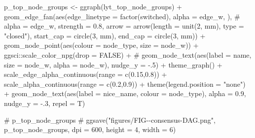 \documentclass[
  letterpaper,
  DIV=11,
  numbers=noendperiod]{scrartcl}
\newenvironment{Shaded}{\begin{snugshade}}{\end{snugshade}}
\newcommand{\AttributeTok}[1]{\textcolor[rgb]{0.40,0.45,0.13}{#1}}
\newcommand{\CommentTok}[1]{\textcolor[rgb]{0.37,0.37,0.37}{#1}}
\newcommand{\ConstantTok}[1]{\textcolor[rgb]{0.56,0.35,0.01}{#1}}
\newcommand{\DecValTok}[1]{\textcolor[rgb]{0.68,0.00,0.00}{#1}}
\newcommand{\FloatTok}[1]{\textcolor[rgb]{0.68,0.00,0.00}{#1}}
\newcommand{\FunctionTok}[1]{\textcolor[rgb]{0.28,0.35,0.67}{#1}}
\newcommand{\NormalTok}[1]{\textcolor[rgb]{0.00,0.23,0.31}{#1}}
\newcommand{\OtherTok}[1]{\textcolor[rgb]{0.00,0.23,0.31}{#1}}
\newcommand{\SpecialCharTok}[1]{\textcolor[rgb]{0.37,0.37,0.37}{#1}}
\newcommand{\StringTok}[1]{\textcolor[rgb]{0.13,0.47,0.30}{#1}}
\begin{document}
\begin{Shaded}
\begin{Highlighting}[]
\NormalTok{p\_top\_node\_groups }\OtherTok{\textless{}{-}} \FunctionTok{ggraph}\NormalTok{(lyt\_top\_node\_groups) }\SpecialCharTok{+}
    \FunctionTok{geom\_edge\_fan}\NormalTok{(}\FunctionTok{aes}\NormalTok{(}\AttributeTok{edge\_linetype =} \FunctionTok{factor}\NormalTok{(switched), }\AttributeTok{alpha =}\NormalTok{ edge\_w, ), }\CommentTok{\# alpha = edge\_w, }
                  \AttributeTok{strength =} \FloatTok{0.8}\NormalTok{,}
                  \AttributeTok{arrow =} \FunctionTok{arrow}\NormalTok{(}\AttributeTok{length =} \FunctionTok{unit}\NormalTok{(}\DecValTok{2}\NormalTok{, }\StringTok{\textquotesingle{}mm\textquotesingle{}}\NormalTok{), }\AttributeTok{type =} \StringTok{"closed"}\NormalTok{),}
                  \AttributeTok{start\_cap =} \FunctionTok{circle}\NormalTok{(}\DecValTok{3}\NormalTok{, }\StringTok{\textquotesingle{}mm\textquotesingle{}}\NormalTok{),}
                  \AttributeTok{end\_cap =} \FunctionTok{circle}\NormalTok{(}\DecValTok{3}\NormalTok{, }\StringTok{\textquotesingle{}mm\textquotesingle{}}\NormalTok{)) }\SpecialCharTok{+}
    \FunctionTok{geom\_node\_point}\NormalTok{(}\FunctionTok{aes}\NormalTok{(}\AttributeTok{colour =}\NormalTok{ node\_type, }\AttributeTok{size =}\NormalTok{ node\_w)) }\SpecialCharTok{+}
\NormalTok{        ggsci}\SpecialCharTok{::}\FunctionTok{scale\_color\_npg}\NormalTok{(}\AttributeTok{drop =} \ConstantTok{FALSE}\NormalTok{) }\SpecialCharTok{+}
        \CommentTok{\# geom\_node\_text(aes(label = name, size = node\_w, alpha = node\_w), nudge\_y = {-}.5) +}
        \FunctionTok{theme\_graph}\NormalTok{() }\SpecialCharTok{+}
        \FunctionTok{scale\_edge\_alpha\_continuous}\NormalTok{(}\AttributeTok{range =} \FunctionTok{c}\NormalTok{(}\FloatTok{0.15}\NormalTok{,}\FloatTok{0.8}\NormalTok{)) }\SpecialCharTok{+}
        \FunctionTok{scale\_alpha\_continuous}\NormalTok{(}\AttributeTok{range =} \FunctionTok{c}\NormalTok{(}\FloatTok{0.2}\NormalTok{,}\FloatTok{0.9}\NormalTok{)) }\SpecialCharTok{+}
        \FunctionTok{theme}\NormalTok{(}\AttributeTok{legend.position =} \StringTok{"none"}\NormalTok{) }\SpecialCharTok{+}
    \FunctionTok{geom\_node\_text}\NormalTok{(}\FunctionTok{aes}\NormalTok{(}\AttributeTok{label =}\NormalTok{ nice\_name, }\AttributeTok{colour =}\NormalTok{ node\_type), }
                   \AttributeTok{alpha =} \FloatTok{0.9}\NormalTok{, }\AttributeTok{nudge\_y =} \SpecialCharTok{{-}}\NormalTok{.}\DecValTok{3}\NormalTok{, }\AttributeTok{repel =}\NormalTok{ T)}

\CommentTok{\# p\_top\_node\_groups}
\CommentTok{\# ggsave("figures/FIG{-}{-}consensus{-}DAG.png", p\_top\_node\_groups, dpi = 600, height = 4, width = 6)}
\end{Highlighting}
\end{Shaded}
\end{document}
